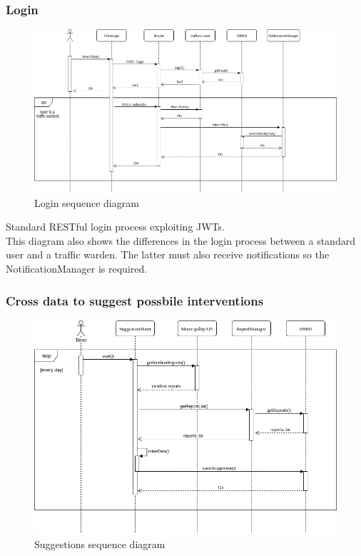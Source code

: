 \documentclass{article}
\begin{document}
\subsubsection{Login}
\begin{figure}[h!]
\centering
	\includegraphics[width=1.0\textwidth]{images/login-sequence-diagram.png}
	\caption{Login sequence diagram}
	\label{fig:login-sequence-diagram}
\end{figure}
Standard RESTful login process exploiting JWTs. \\
This diagram also shows the differences in the login process between a standard user and a traffic warden. The latter must also receive notifications so the NotificationManager is required.

\newpage
\subsubsection{Cross data to suggest possbile interventions}
\begin{figure}[h!]
\centering
	\includegraphics[width=1.0\textwidth]{images/miner-sequence-diagram.png}
	\caption{Suggestions sequence diagram}
	\label{fig:miner-sequence-diagram}
\end{figure}
\end{document}
